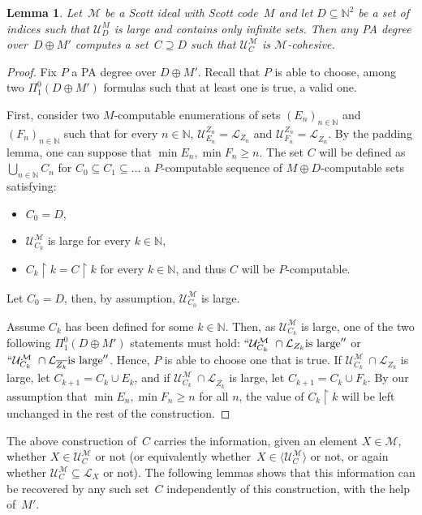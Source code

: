 \documentclass{article}
\def\NN{\mathbb{N}}
\def\U{\mathcal{U}}
\def\M{\mathcal{M}}
\renewcommand{\L}[0]{\mathcal{L}}
\newcommand{\uh}{\upharpoonright}
\def\qt#1{``#1''}%
\numberwithin{theorem}{section}
\newtheorem{lemma}[theorem]{Lemma}
\theoremstyle{definition}
\begin{document}
\begin{lemma}\label{lem:computation-m-cohesive}
Let~$\M$ be a Scott ideal with Scott code~$M$ and let $D \subseteq \NN^2$ be a set of indices such that $\U^M_D$ is large and contains only infinite sets. Then any PA degree over~$D \oplus M'$ computes a set~$C \supseteq D$ such that $\U^\M_C$ is $\M$-cohesive.
\end{lemma}
\begin{proof}
Fix $P$ a PA degree over $D \oplus M'$. Recall that $P$ is able to choose, among two $\Pi^0_1(D \oplus M')$ formulas such that at least one is true, a valid one.

First, consider two $M$-computable enumerations of sets $(E_n)_{n\in \NN}$ and  $(F_n)_{n\in \NN}$ such that for every $n \in \NN$, $\U_{E_n}^{Z_n} = \L_{Z_n}$ and $\U_{F_n}^{Z_n} = \L_{\overline{Z_n}}$. By the padding lemma, one can suppose that $\min E_n, \min F_n \geq n$. The set $C$ will be defined as $\bigcup_{n \in \NN} C_n$ for $C_0 \subseteq C_1 \subseteq \dots$ a $P$-computable sequence of $M \oplus D$-computable sets satisfying:
\begin{itemize}
    \item $C_{0} = D$,
    \item $\U_{C_k}^{\M}$ is large for every $k \in \NN$,
    \item $C_k \uh k = C \uh k$ for every $k \in \NN$, and thus $C$ will be $P$-computable.
\end{itemize}

Let $C_{0} = D$, then, by assumption, $\U_{C_{0}}^{\M}$ is large.

Assume $C_k$ has been defined for some $k \in \NN$. Then, as $\U_{C_k}^{\M}$ is large, one of the two following $\Pi_1^0(D \oplus M')$ statements must hold: $\qt{\U_{C_k}^{\M}\ \cap \L_{Z_k} \mbox{is large}}$ or $\qt{\U_{C_k}^{\M}\ \cap \L_{\overline{Z_k}} \mbox{is large}}$. Hence, $P$ is able to choose one that is true. If $\U_{C_k}^{\M}\ \cap \L_{Z_k}$ is large, let $C_{k+1} = C_k \cup E_k$, and if $\U_{C_k}^{\M}\ \cap \L_{\overline{Z_k}}$ is large, let $C_{k+1} = C_k \cup F_k$. By our assumption that $\min E_n, \min F_n \geq n$ for all $n$, the value of $C_k \uh k$ will be left unchanged in the rest of the construction.
\end{proof}

The above construction of~$C$ carries the information, given an element $X \in \M$, whether $X \in \U_C^\M$ or not (or equivalently whether~$X \in \langle \U_C^\M \rangle$ or not, or again whether $\U_C^\M \subseteq \L_X$ or not). The following lemmas shows that this information can be recovered by any such set~$C$ independently of this construction, with the help of~$M'$.
\end{document}
